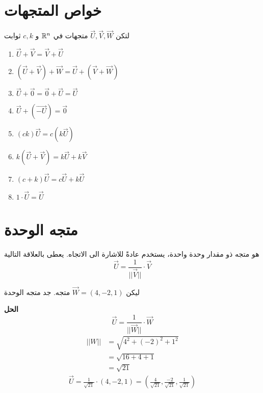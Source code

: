 \section[خواص المتجهات]{خواص المتجهات \cite{key2}}
لتكن $\vec{U}, \vec{V}, \vec{W}$ متجهات في $\mathbb{R}^n$ و $c,k$ ثوابت
\begin{english}
	\begin{enumerate}
		\item $\vec{U} + \vec{V} = \vec{V} + \vec{U}$
		\item $(\vec{U} + \vec{V} )+ \vec{W} = \vec{U} + (\vec{V} + \vec{W})$
		\item $\vec{U}+\vec{0} = \vec{0} + \vec{U} = \vec{U}$
		\item $\vec{U} + (\vec{-U}) = \vec{0}$
		\item $(ck)\vec{U} = c(k\vec{U})$
		\item $k(\vec{U}+\vec{V}) = k\vec{U} + k\vec{V}$
		\item $(c+k)\vec{U} = c\vec{U} + k\vec{U}$
		\item $1\cdot \vec{U} = \vec{U}$
	\end{enumerate}
\end{english}

\section[متجه الوحدة]{متجه الوحدة \cite{key1}}
هو متجه ذو مقدار وحدة واحدة، يستخدم عادةً للاشارة الى الاتجاه. يعطى بالعلاقة التالية
\[
\vec{U} = \frac{1}{|| \vec{V}||}\cdot \vec{V}
\]

\begin{example}
	ليكن $\vec{W}=(4,-2,1)$ متجه. جد متجه الوحدة
\end{example}
\noindent
\textbf{الحل}
\[
\vec{U} = \frac{1}{|| \vec{W}||}\cdot \vec{W}
\]
\begin{align*}
	||W|| &= \sqrt{4^2 + (-2)^2 + 1^2}\\
	& = \sqrt{16 + 4 +1}\\
	&= \sqrt{21}
\end{align*}
\begin{align*}
	\vec{U} = \frac{1}{\sqrt{21}}\cdot(4,-2,1) = \left(\frac{4}{\sqrt{21}}, \frac{-2}{\sqrt{21}}, \frac{1}{\sqrt{21}}\right)
\end{align*}

